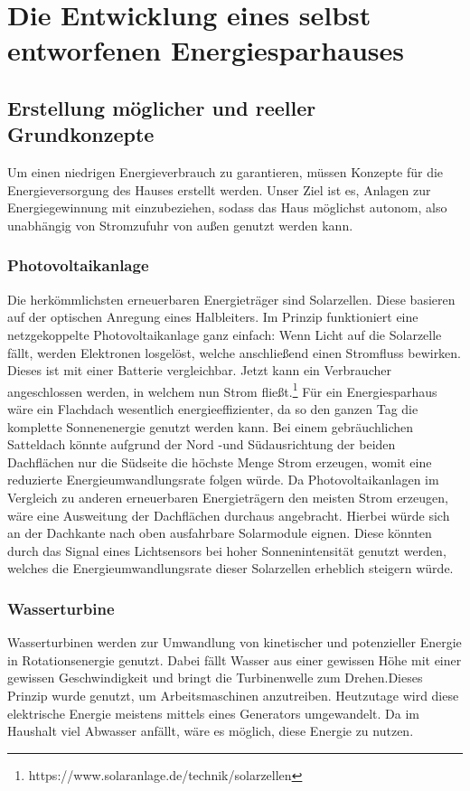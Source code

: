 \section{Die Entwicklung eines selbst entworfenen Energiesparhauses}
\par
\subsection{Erstellung möglicher und reeller Grundkonzepte}
Um einen niedrigen Energieverbrauch zu garantieren, müssen Konzepte für die Energieversorgung
des Hauses erstellt werden. Unser Ziel ist es, Anlagen zur Energiegewinnung mit einzubeziehen,
sodass das Haus möglichst autonom, also unabhängig von Stromzufuhr von außen genutzt werden kann. 
\subsubsection{Photovoltaikanlage}
Die herkömmlichsten erneuerbaren Energieträger sind Solarzellen. Diese basieren
auf der optischen Anregung eines Halbleiters. Im Prinzip funktioniert eine netzgekoppelte
Photovoltaikanlage ganz einfach: Wenn Licht auf die Solarzelle fällt, werden Elektronen losgelöst,
welche anschließend einen Stromfluss bewirken. Dieses ist mit einer Batterie
vergleichbar. Jetzt kann ein Verbraucher angeschlossen werden, in welchem nun Strom fließt.\footnote{https://www.solaranlage.de/technik/solarzellen}
Für ein Energiesparhaus wäre ein Flachdach wesentlich energieeffizienter, da so den ganzen Tag
die komplette Sonnenenergie genutzt werden kann. Bei einem gebräuchlichen Satteldach könnte
aufgrund der Nord -und Südausrichtung der beiden Dachflächen nur die Südseite die höchste Menge Strom
erzeugen, womit eine reduzierte Energieumwandlungsrate folgen würde. Da
Photovoltaikanlagen im Vergleich zu anderen erneuerbaren Energieträgern den meisten Strom
erzeugen, wäre eine Ausweitung der Dachflächen durchaus angebracht. Hierbei würde sich an der
Dachkante nach oben ausfahrbare Solarmodule eignen. Diese könnten durch das Signal eines 
Lichtsensors bei hoher Sonnenintensität genutzt werden, welches die Energieumwandlungsrate
dieser Solarzellen erheblich steigern würde.
\subsubsection{Wasserturbine}
Wasserturbinen werden zur Umwandlung von kinetischer und potenzieller Energie in
Rotationsenergie genutzt. Dabei fällt Wasser aus einer gewissen Höhe mit einer gewissen
Geschwindigkeit und bringt die Turbinenwelle zum Drehen.Dieses Prinzip wurde genutzt, um
Arbeitsmaschinen anzutreiben. Heutzutage wird diese elektrische Energie meistens mittels eines Generators umgewandelt. Da im Haushalt viel Abwasser anfällt, wäre es möglich, diese
Energie zu nutzen.
